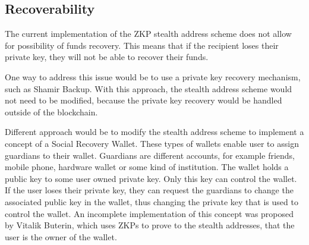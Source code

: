 \subsection*{Recoverability}

The current implementation of the ZKP stealth address scheme does not allow for
possibility of funds recovery. This means that if the recipient loses their
private key, they will not be able to recover their funds.

One way to address this issue would be to use a private key recovery
mechanism, such as Shamir Backup. With this approach, the stealth address
scheme would not need to be modified, because the private key recovery would
be handled outside of the blockchain.

Different approach would be to modify the stealth address scheme to implement
a concept of a Social Recovery Wallet. These types of wallets enable user to
assign guardians to their wallet. Guardians are different accounts, for example
friends, mobile phone, hardware wallet or some kind of institution. The wallet
holds a public key to some user owned private key. Only this key can control
the wallet. If the user loses their private key, they can request the
guardians to change the associated public key in the wallet, thus changing the
private key that is used to control the wallet\cite{ButerinSocialRecovery}.
An incomplete implementation of this concept was proposed by Vitalik Buterin\cite{ButerinIncompleteGuide},
which uses ZKPs to prove to the stealth addresses, that the user is the owner
of the wallet.


